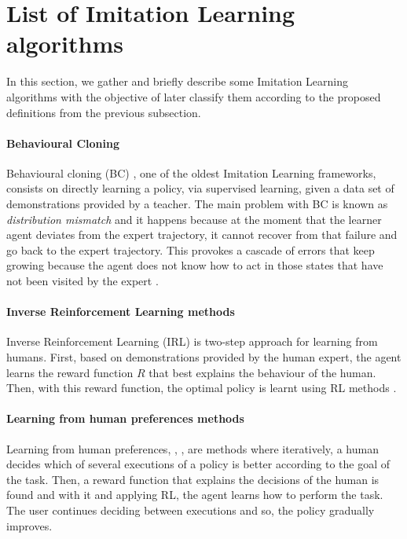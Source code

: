 \chapter{List of Imitation Learning algorithms}
\label{appendix:List of Imitation Learning algorithms}



In this section, we gather and briefly describe some Imitation Learning algorithms with the objective of later classify them according to the proposed definitions from the previous subsection.




\subsubsection*{Behavioural Cloning}
Behavioural cloning (BC) \cite{Behavioural-Cloning-Pomerleau:1991}, one of the oldest Imitation Learning frameworks, consists on directly learning a policy, via supervised learning, given a data set of demonstrations provided by a teacher. The main problem with BC is known as \textit{distribution mismatch} and it happens because at the moment that the learner agent deviates from the expert trajectory, it cannot recover from that failure and go back to the expert trajectory. This provokes a cascade of errors that keep growing because the agent does not know how to act in those states that have not been visited by the expert \cite{Global-overview-Attia:2018}.

\subsubsection*{Inverse Reinforcement Learning methods}
Inverse Reinforcement Learning (IRL) is two-step approach for learning from humans. First, based on demonstrations provided by the human expert, the agent learns the reward function $R$ that best explains the behaviour of the human. Then, with this reward function, the optimal policy is learnt using RL methods \cite{inverse-reinforcement-learning}.

\subsubsection*{Learning from human preferences methods}
Learning from human preferences, \cite{learning-from-human-preferences:2017}, \cite{learning-from-human-preferences:2018},  are methods where iteratively, a human decides which of several executions of a policy is better according to the goal of the task. Then, a reward function that explains the decisions of the human is found and with it and applying RL, the agent learns how to perform the task. The user continues deciding between executions and so,  the policy gradually improves.



